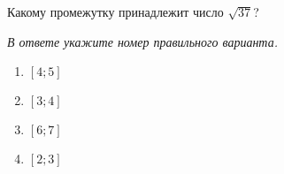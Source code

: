 Какому промежутку принадлежит число $\sqrt{37}$?

\textit{В ответе укажите номер правильного варианта.}
\begin{multicols}{4}
	\begin{enumerate}[label=\arabic*)]
		\item $[4;5]$
		\item $[3;4]$
		\item $[6;7]$
		\item $[2;3]$
	\end{enumerate}
\end{multicols}